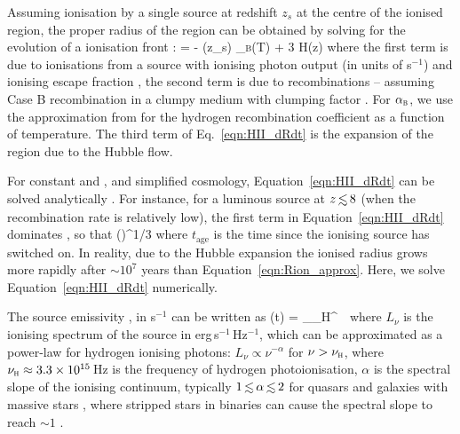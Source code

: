\documentclass[fleqn,usenatbib]{mnras}
\begin{document}
Assuming ionisation by a single source at redshift $z_s$ at the centre of the ionised region, the proper radius of the region can be obtained by solving for the evolution of a ionisation front \citep[e.g,][]{Shapiro1987,Cen2000,Yajima2018}:
%
\BE \label{eqn:HII_dRdt}
 =  - \clump \nh(z_s) \alpha_\textsc{b}(T) \Rion[3] + 3 H(z) \Rion[3]
\EE
%
where the first term is due to ionisations from a source with ionising photon output \Nion (in units of s$^{-1}$) and ionising escape fraction \fesc, the second term is due to recombinations -- assuming Case B recombination in a clumpy medium with clumping factor \clump. For $\alpha_\textsc{b}$, we use the approximation from \citet{Hui1997} for the hydrogen recombination coefficient as a function of temperature. The third term of Eq.~\eqref{eqn:HII_dRdt} is the expansion of the region due to the Hubble flow.

For constant \Nion and \fesc, and simplified cosmology, Equation~\eqref{eqn:HII_dRdt} can be solved analytically \citep{Shapiro1987}. For instance, for a luminous source at $z\simlt8$ (when the recombination rate is relatively low), the first term in Equation~\eqref{eqn:HII_dRdt} dominates \citep[Equation 2 of][]{Cen2000}, so that
%
\BE \label{eqn:Rion_approx}
\Rion \approx \left(\right)^{1/3}
\EE
%
where $t_\mathrm{age}$ is the time since the ionising source has switched on. In reality, due to the Hubble expansion the ionised radius grows more rapidly after $\sim10^7$ years than Equation~\eqref{eqn:Rion_approx}. Here, we solve Equation~\eqref{eqn:HII_dRdt} numerically. 

The source emissivity \Nion, in s$^{-1}$ can be written as
%
\BE \label{eqn:HII_Nion}
\Nion(t) = \int_{\nu_H}^\infty \, \dd\nu \, 
\EE
%
where $L_\nu$ is the ionising spectrum of the source in erg\,s$^{-1}$\,Hz$^{-1}$, which can be approximated as a power-law for hydrogen ionising photons: $L_\nu \propto \nu^{-\alpha}$ for $\nu > \nu_\textsc{h}$, where $\nu_\textsc{h} \approx 3.3\times10^{15}$\,Hz is the frequency of hydrogen photoionisation, $\alpha$ is the spectral slope of the ionising continuum, typically $1 \simlt \alpha \simlt 2$ for quasars \citep[e.g.,][]{Scott2004,Stevans2014,Lusso2015} and galaxies with massive stars \citep{Steidel2014,Feltre2016}, where stripped stars in binaries can cause the spectral slope to reach $\sim 1$ \citep{Gotberg2019}.
\end{document}
